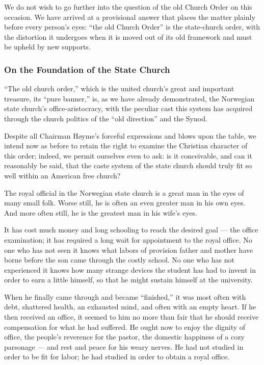 We do not wish to go further into the question of the old Church Order on this occasion. We have arrived at a provisional answer that places the matter plainly before every person’s eyes: “the old Church Order” is the state-church order, with the distortion it undergoes when it is moved out of its old framework and must be upheld by new supports.


\subsubsection{On the Foundation of the State Church}

“The old church order,” which is the united church’s great and important treasure, its “pure banner,” is, as we have already demonstrated, the Norwegian state church’s office-aristocracy, with the peculiar cast this system has acquired through the church politics of the “old direction” and the Synod.

Despite all Chairman Høyme’s forceful expressions and blows upon the table, we intend now as before to retain the right to examine the Christian character of this order; indeed, we permit ourselves even to ask: is it conceivable, and can it reasonably be said, that the caste system of the state church should truly fit so well within an American free church?

The royal official in the Norwegian state church is a great man in the eyes of many small folk. Worse still, he is often an even greater man in his own eyes. And more often still, he is the greatest man in his wife’s eyes.

It has cost much money and long schooling to reach the desired goal — the office examination; it has required a long wait for appointment to the royal office. No one who has not seen it knows what labors of provision father and mother have borne before the son came through the costly school. No one who has not experienced it knows how many strange devices the student has had to invent in order to earn a little himself, so that he might sustain himself at the university.

When he finally came through and became “finished,” it was most often with debt, shattered health, an exhausted mind, and often with an empty heart. If he then received an office, it seemed to him no more than fair that he should receive compensation for what he had suffered. He ought now to enjoy the dignity of office, the people’s reverence for the pastor, the domestic happiness of a cozy parsonage — and rest and peace for his weary nerves. He had not studied in order to be fit for labor; he had studied in order to obtain a royal office.

